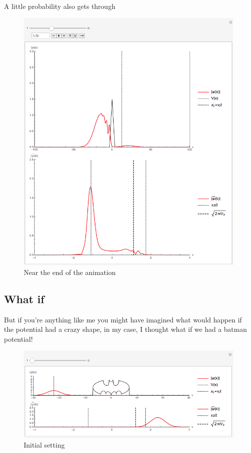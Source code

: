 \documentclass[titlepage]{article}
\begin{document}
A little probability also gets through

\begin{figure}[ht]
\centering
\includegraphics[scale=0.5,center]{images/triangular3.png}
\caption{Near the end of the animation}
\label{fig:2d}
\end{figure}
\FloatBarrier

\subsection{What if}

But if you're anything like me you might have imagined what would happen if the potential had a crazy shape, in my case, I thought what if we had a batman potential!

\begin{figure}[ht]
\centering
\includegraphics[scale=0.5,center]{images/batman1.png}
\caption{Initial setting}
\label{fig:2d}
\end{figure}
\FloatBarrier
\end{document}
